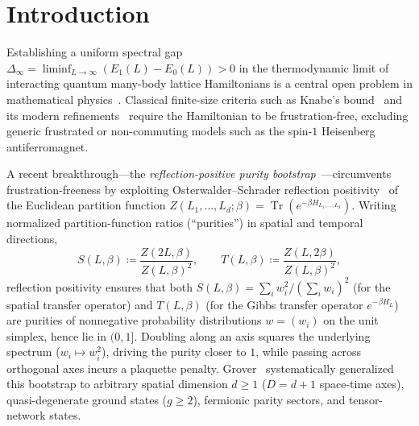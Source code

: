 \documentclass[11pt,a4paper]{article}
\theoremstyle{definition}
\newcommand{\Tr}{\operatorname{Tr}}
\begin{document}
\section{Introduction}
\label{sec:intro}

Establishing a uniform spectral gap $\Delta_\infty = \liminf_{L\to\infty}(E_1(L)-E_0(L)) > 0$ in the thermodynamic limit of interacting quantum many-body lattice Hamiltonians is a central open problem in mathematical physics~\cite{Haldane1983Continuum,Haldane1983Nonlinear,Affleck1987AKLT,Affleck1988AKLT}. Classical finite-size criteria such as Knabe's bound~\cite{Knabe1988Energy} and its modern refinements~\cite{Gosset2016Local,Lemm2019Spectral,Anshu2020Improved} require the Hamiltonian to be frustration-free, excluding generic frustrated or non-commuting models such as the spin-$1$ Heisenberg antiferromagnet.

A recent breakthrough—the \emph{reflection-positive purity bootstrap}~\cite{OpenAI2026Haldane,Tasaki2026Purity}—circumvents frustration-freeness by exploiting Osterwalder--Schrader reflection positivity~\cite{Osterwalder1973Axioms,Frohlich1978Reflection} of the Euclidean partition function $Z(L_1,\dots,L_d;\beta) = \Tr(e^{-\beta H_{L_1,\dots,L_d}})$. Writing normalized partition-function ratios (``purities'') in spatial and temporal directions,
\begin{equation}
  S(L,\beta) \coloneqq \frac{Z(2L,\beta)}{Z(L,\beta)^2}, \qquad
  T(L,\beta) \coloneqq \frac{Z(L,2\beta)}{Z(L,\beta)^2},
  \label{eq:ST_def}
\end{equation}
reflection positivity ensures that both $S(L,\beta) = \sum_i w_i^2 / (\sum_i w_i)^2$ (for the spatial transfer operator) and $T(L,\beta)$ (for the Gibbs transfer operator $e^{-\beta H_L}$) are purities of nonnegative probability distributions $w = (w_i)$ on the unit simplex, hence lie in $(0,1]$. Doubling along an axis squares the underlying spectrum ($w_i \mapsto w_i^2$), driving the purity closer to $1$, while passing across orthogonal axes incurs a plaquette penalty. Grover~\cite{Grover2026Extensions} systematically generalized this bootstrap to arbitrary spatial dimension $d \ge 1$ ($D = d+1$ space-time axes), quasi-degenerate ground states ($g \ge 2$), fermionic parity sectors, and tensor-network states.
\end{document}
